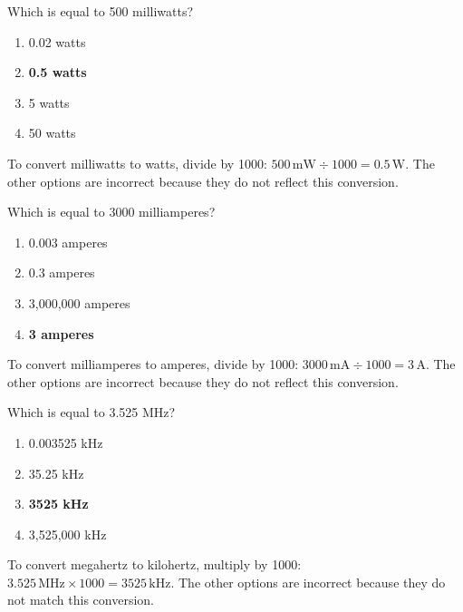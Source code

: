 \begin{tcolorbox}[colback=gray!10!white,colframe=black!75!black,title={T5B05}]
    Which is equal to 500 milliwatts?
    \begin{enumerate}[label=\Alph*,noitemsep]
        \item 0.02 watts
        \item \textbf{0.5 watts}
        \item 5 watts
        \item 50 watts
    \end{enumerate}
\end{tcolorbox}
To convert milliwatts to watts, divide by 1000: \(500 \, \text{mW} \div 1000 = 0.5 \, \text{W}\). The other options are incorrect because they do not reflect this conversion.

\begin{tcolorbox}[colback=gray!10!white,colframe=black!75!black,title={T5B06}]
    Which is equal to 3000 milliamperes?
    \begin{enumerate}[label=\Alph*,noitemsep]
        \item 0.003 amperes
        \item 0.3 amperes
        \item 3,000,000 amperes
        \item \textbf{3 amperes}
    \end{enumerate}
\end{tcolorbox}
To convert milliamperes to amperes, divide by 1000: \(3000 \, \text{mA} \div 1000 = 3 \, \text{A}\). The other options are incorrect because they do not reflect this conversion.

\begin{tcolorbox}[colback=gray!10!white,colframe=black!75!black,title={T5B07}]
    Which is equal to 3.525 MHz?
    \begin{enumerate}[label=\Alph*,noitemsep]
        \item 0.003525 kHz
        \item 35.25 kHz
        \item \textbf{3525 kHz}
        \item 3,525,000 kHz
    \end{enumerate}
\end{tcolorbox}
To convert megahertz to kilohertz, multiply by 1000: \(3.525 \, \text{MHz} \times 1000 = 3525 \, \text{kHz}\). The other options are incorrect because they do not match this conversion.

